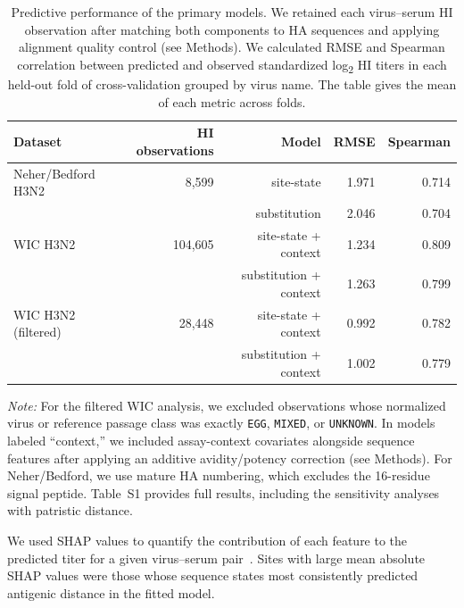 \documentclass[12pt]{article}
\begin{document}
\begin{table}[t]
\centering
\caption{Predictive performance of the primary models. We retained each virus--serum HI observation after matching both components to HA sequences and applying alignment quality control (see Methods). We calculated RMSE and Spearman correlation between predicted and observed standardized log\textsubscript{2} HI titers in each held-out fold of cross-validation grouped by virus name. The table gives the mean of each metric across folds.}
\label{tab:primary-model-summary}
\small
\begin{tabular}{lrrrr}
\toprule
Dataset & HI observations & Model & RMSE & Spearman \\
\midrule
Neher/Bedford H3N2 & 8{,}599 & site-state & 1.971 & 0.714 \\
 &  & substitution & 2.046 & 0.704 \\
WIC H3N2 & 104{,}605 & site-state + context & 1.234 & 0.809 \\
 &  & substitution + context & 1.263 & 0.799 \\
WIC H3N2 (filtered) & 28{,}448 & site-state + context & 0.992 & 0.782 \\
 &  & substitution + context & 1.002 & 0.779 \\
\bottomrule
\end{tabular}
\par\vspace{0.4em}
\begin{minipage}{\textwidth}
\raggedright\footnotesize
\textit{Note:} For the filtered WIC analysis, we excluded observations whose normalized virus or reference passage class was exactly \texttt{EGG}, \texttt{MIXED}, or \texttt{UNKNOWN}. In models labeled ``context,'' we included assay-context covariates alongside sequence features after applying an additive avidity/potency correction (see Methods). For Neher/Bedford, we use mature HA numbering, which excludes the 16-residue signal peptide. Table~S1 provides full results, including the sensitivity analyses with patristic distance.
\end{minipage}
\normalsize
\end{table}

We used SHAP values to quantify the contribution of each feature to the predicted titer for a given virus--serum pair~\cite{Lundberg2017, Lundberg2020NatMachIntell}. Sites with large mean absolute SHAP values were those whose sequence states most consistently predicted antigenic distance in the fitted model.
\end{document}
